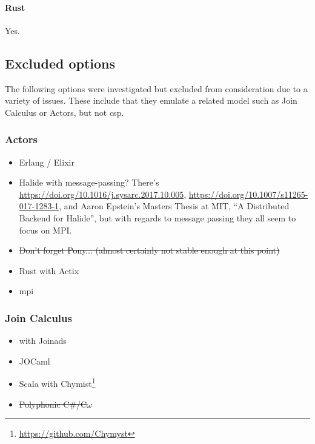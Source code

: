 \paragraph{Rust}
Yes.


\subsection{Excluded options}
The following options were investigated but excluded from consideration due to a variety of issues.  These include that they emulate a related model such as Join Calculus or Actors, but not \gls{csp}.  

\subsubsection{Actors}
\begin{itemize}
    \item Erlang / Elixir
    \item Halide with message-passing?  There's \url{https://doi.org/10.1016/j.sysarc.2017.10.005}, \url{https://doi.org/10.1007/s11265-017-1283-1}, and Aaron Epstein's Masters Thesis at MIT, ``A Distributed Backend for Halide'', but with regards to message passing they all seem to focus on MPI.%
    \item \sout{Don't forget Pony...  (almost certainly not stable enough at this point)}
    \item Rust with Actix
    \item \gls{mpi}
\end{itemize}

\subsubsection{Join Calculus}
\begin{itemize}
    \item \fsharp{} with Joinads
    \item JOCaml
    \item Scala with Chymist\footnote{\url{https://github.com/Chymyst}}
    \item \sout{Polyphonic C\#/C\(\omega\)}
\end{itemize}


